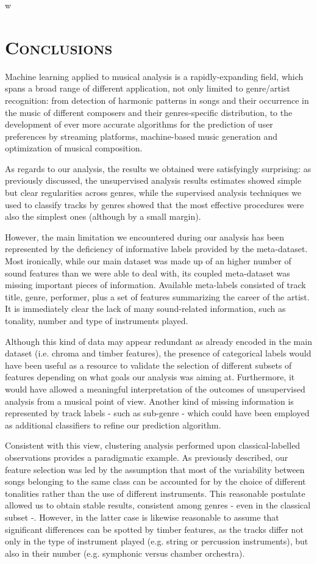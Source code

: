 w\documentclass[11pt, oneside]{article}
\begin{document}
\newpage

\section[Conclusions]{\textsc{Conclusions}}
Machine learning applied to musical analysis is a rapidly-expanding field, which spans a broad range of different application, not only limited to genre/artist recognition: from detection of harmonic patterns in songs and their occurrence in the music of different composers and their genres-specific distribution, to the development of ever more accurate algorithms for the prediction of user preferences by streaming platforms, machine-based music generation and optimization of musical composition. 

As regards to our analysis, the results we obtained were satisfyingly surprising: as previously discussed, the unsupervised analysis results estimates showed simple but clear regularities across genres, while the supervised analysis techniques we used to classify tracks by genres showed that the most effective procedures were also the simplest ones (although by a small margin). 

However, the main limitation we encountered during our analysis has been represented by the deficiency of informative labels provided by the meta-dataset. Most ironically, while our main dataset was made up of an higher number of sound features than we were able to deal with, its coupled meta-dataset was missing important pieces of information.
Available meta-labels consisted of track title, genre, performer, plus a set of features summarizing the career of the artist. 
It is immediately clear the lack of many sound-related information, such as tonality, number and type of instruments played. 

Although this kind of data may appear redundant as already encoded in the main dataset (i.e. chroma and timber features), the presence of categorical labels would have been useful as a resource to validate the selection of different subsets of features depending on what goals our analysis was aiming at. Furthermore, it would have allowed a meaningful interpretation of the outcomes of unsupervised analysis from a musical point of view.
Another kind of missing information is represented by track labels - such as sub-genre - which could have been employed as additional classifiers to refine our prediction algorithm.

Consistent with this view, clustering analysis performed upon classical-labelled observations provides a paradigmatic example. As previously described, our feature selection was led by the assumption that most of the variability between songs belonging to the same class can be accounted for by the choice of different tonalities rather than the use of different instruments. This reasonable postulate allowed us to obtain stable results, consistent among genres - even in the classical subset -. However, in the latter case is likewise reasonable to assume that significant differences can be spotted by timber features, as the tracks differ not only in the type of instrument played (e.g. string or percussion instruments), but also in their number (e.g. symphonic versus chamber orchestra).
\end{document}

